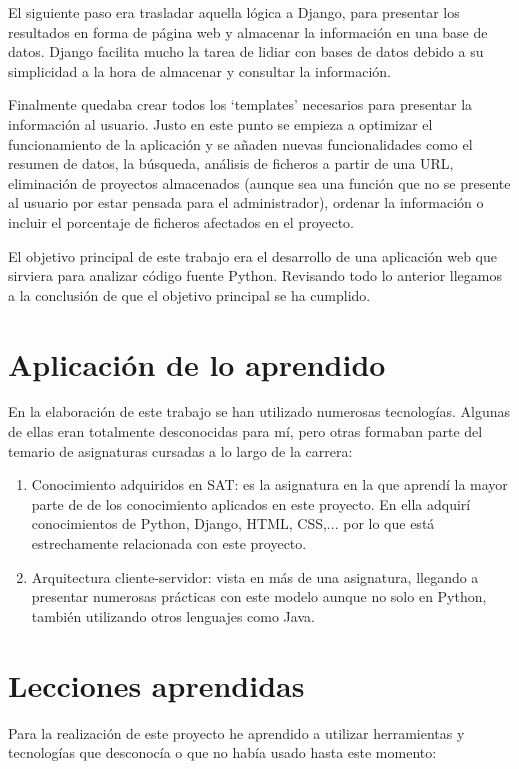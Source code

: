 \documentclass[a4paper, 12pt]{book}
\begin{document}
El siguiente paso era trasladar aquella lógica a Django, para presentar los resultados en forma de página web y almacenar la información en una base de datos. Django facilita mucho la tarea de lidiar con bases de datos debido a su simplicidad a la hora de almacenar y consultar la información.

Finalmente quedaba crear todos los `templates' necesarios para presentar la información al usuario. Justo en este punto se empieza a optimizar el funcionamiento de la aplicación y se añaden nuevas funcionalidades como el resumen de datos, la búsqueda, análisis de ficheros a partir de una URL, eliminación de proyectos almacenados (aunque sea una función que no se presente al usuario por estar pensada para el administrador), ordenar la información o incluir el porcentaje de ficheros afectados en el proyecto.

El objetivo principal de este trabajo era el desarrollo de una aplicación web que sirviera para analizar código fuente Python. Revisando todo lo anterior llegamos a la conclusión de que el objetivo principal se ha cumplido.

\section{Aplicación de lo aprendido}
\label{sec:aplicacion}
En la elaboración de este trabajo se han utilizado numerosas tecnologías. Algunas de ellas eran totalmente desconocidas para mí, pero otras formaban parte del temario de asignaturas cursadas a lo largo de la carrera:

\begin{enumerate}
  \item Conocimiento adquiridos en SAT: es la asignatura en la que aprendí la mayor parte de de los conocimiento aplicados en este proyecto. En ella adquirí conocimientos de Python, Django, HTML, CSS,... por lo que está estrechamente relacionada con este proyecto.
  \item Arquitectura cliente-servidor: vista en más de una asignatura, llegando a presentar numerosas prácticas con este modelo aunque no solo en Python, también utilizando otros lenguajes como Java.
\end{enumerate}


\section{Lecciones aprendidas}
\label{sec:lecciones_aprendidas}
Para la realización de este proyecto he aprendido a utilizar herramientas y tecnologías que desconocía o que no había usado hasta este momento:
\end{document}
